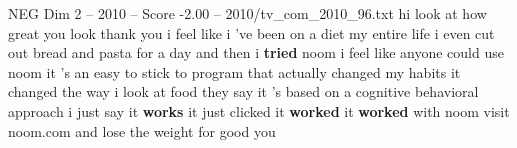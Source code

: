 \begin{textsample}{NEG Dim 2 – 2010 – Score -2.00 – 2010/tv\_com\_2010\_96.txt}  \label{ex:f2_neg_053}
hi look at how great you look thank you i feel like i 've been on a diet my entire life i even cut out bread and pasta for a day and then i \textbf{tried} noom i feel like anyone could use noom it 's an easy to stick to program that actually changed my habits it changed the way i look at food they say it 's based on a cognitive behavioral approach i just say it \textbf{works} it just clicked it \textbf{worked} it \textbf{worked} with noom visit noom.com and lose the weight for good you

\end{textsample}
